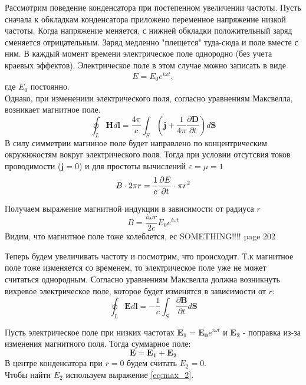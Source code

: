 \indent
Рассмотрим поведение конденсатора при постепенном увеличении частоты. Пусть сначала к обкладкам конденсатора приложено переменное напряжение низкой частоты. Когда напряжение меняется, с нижней обкладки положительный заряд сменяется отрицательным. Заряд медленно "плещется" туда-сюда и поле вместе с ним. В каждый момент времени электрическое поле однородно (без учета краевых эффектов). Электрическое поле в этом случае можно записать в виде
\begin{equation}
    E = E_0 e^{i\omega t},
\end{equation}
где $E_0$ постоянно. \\
\indent
Однако, при изменениии электрического поля, согласно уравнениям Максвелла, возникает магнитное поле.
\begin{equation}
    \oint_L \mathbf{H}d\mathbf{l} = \frac{4\pi}{c}\int_S \left(\mathbf{j} + \frac{1}{4\pi}\frac{\partial \mathbf{D}}{\partial t}\right)d\mathbf{S} \label{eq:max_1}
\end{equation}
В силу симметрии магниное поле будет направлено по концентрическим окружнжостям вокруг электрического поля. Тогда при условии отсутсвия токов проводимости ($\mathbf{j} = 0$) и для простоты вычислений $\varepsilon = \mu = 1$
$$ B \cdot 2\pi r = \frac{1}{c}\frac{\partial E}{\partial t} \cdot \pi r^2\\ $$

Получаем выражение магнитной индукции в зависимости от радиуса $r$
\begin{equation}
    B = \frac{i\omega r}{2 c}E_0 e^{i\omega t}\label{eq:B1}
\end{equation}
Видим, что магнитное поле тоже колеблется, ес
SOMETHING!!!! page 202

\indent
Теперь будем увеличивать частоту и посмотрим, что происходит. Т.к магнитное поле тоже изменяется со временем, то электрическое поле уже не может считаться однородным. Согласно уравнениям Максвелла должна возникнуть вихревое электрическое поле, которое будет изменятся в зависимости от $r$:
\begin{equation}
    \oint_L \mathbf{E}d\mathbf{l} = -\frac{1}{c}\int_S \frac{\partial \mathbf{B}}{\partial t}d\mathbf{S} \label{eq:max_2}
\end{equation}

\indent
Пусть электрическое поле при низких частотах $\mathbf{E_1} = \mathbf{E_0} e^{i\omega t}$ и $\mathbf{E_2}$ - поправка из-за изменения магнитного поля. Тогда суммарное поле:
$$ \mathbf{E} = \mathbf{E_1} + \mathbf{E_2}$$
В центре конденсатора при $r = 0$ будем считать $E_2 = 0$.\\
\indent
Чтобы найти $E_2$ используем выражение \ref{eq:max_2}.

